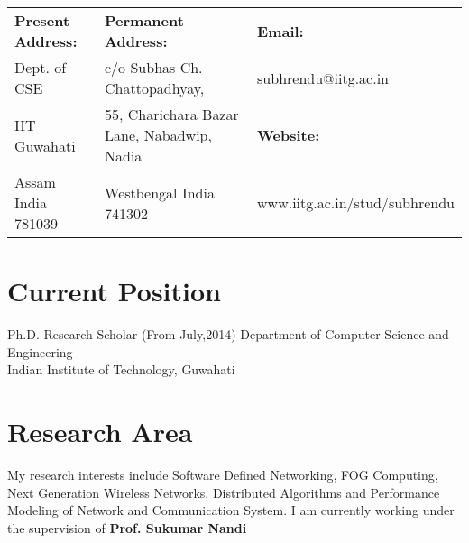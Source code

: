 \documentclass{article}
\begin{document}
 
\begin{center}
	\Large{\bf \name}
\end{center}
%                                  
	\begin{table}[h]
	\centering
	\begin{tabular}{|lll|}
	\hline
	{\bf Present Address:}    & {\bf Permanent Address:}        					&	{\bf Email:}               \\
	Dept. of CSE       				& c/o Subhas Ch. Chattopadhyay, 					&	subhrendu@iitg.ac.in         \\
	IIT Guwahati       			& 55, Charichara Bazar Lane, Nabadwip, Nadia  &	{\bf Website:}  \\
	Assam India 781039 		& Westbengal  India 741302 							&	www.iitg.ac.in/stud/subhrendu \\ \hline
	\end{tabular}
	\end{table}
 \noindent\makebox[\linewidth]{\rule{\textwidth}{0.4pt}}
\section{Current Position}          
	Ph.D. Research Scholar  (From July,2014)  
    Department of Computer Science and Engineering\\
    Indian Institute of Technology, Guwahati
\section{Research Area}    
 		My research interests include Software Defined Networking, FOG Computing, Next Generation Wireless Networks, Distributed Algorithms and Performance Modeling of Network and Communication System. I am currently working under the supervision of {\bf Prof. Sukumar Nandi}
\end{document}
